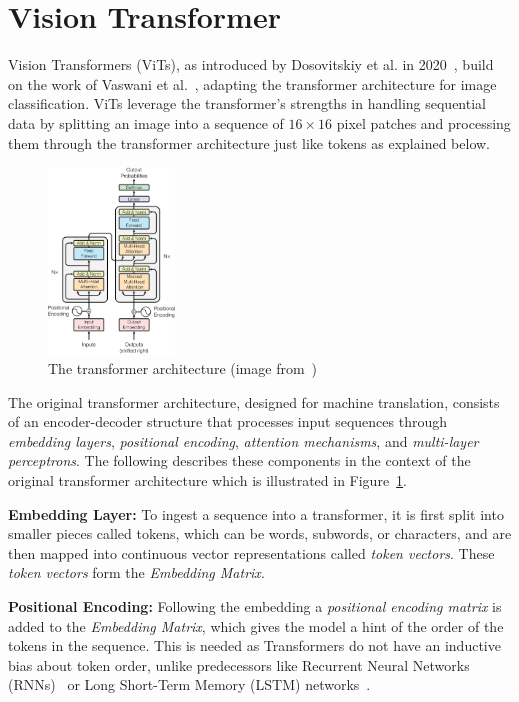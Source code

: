 \section{Vision Transformer}\label{sec:vision-transformer}
Vision Transformers (ViTs), as introduced by Dosovitskiy et al. in 2020~\cite{Dosovitskiy2020}, build on the work of Vaswani et al.~\cite{Vaswani2017}, adapting the transformer architecture for image classification. 
ViTs leverage the transformer's strengths in handling sequential data by splitting an image into a sequence of $16\times16$ pixel patches and processing them through the transformer architecture just like tokens as explained below.
\begin{figure}[h]
    \centering
    \includegraphics[width=0.3\textwidth]{images/TransformerArchitectureVaswani2017TransformerPage3.png}
    \caption[The original transformer architecture]{The transformer architecture (image from~\cite{Vaswani2017})}\label{fig:transformer}
\end{figure}

The original transformer architecture, designed for machine translation, consists of an encoder-decoder structure that processes input sequences through \emph{embedding layers}, \emph{positional encoding}, \emph{attention mechanisms}, and \emph{multi-layer perceptrons}. 
The following describes these components in the context of the original transformer architecture which is illustrated in Figure~\ref{fig:transformer}.

\textbf{Embedding Layer:} To ingest a sequence into a transformer, it is first split into smaller pieces called tokens, which can be words, subwords, or characters, and are then mapped into continuous vector representations called \emph{token vectors}. 
These \emph{token vectors} form the \emph{Embedding Matrix}.

\textbf{Positional Encoding:} Following the embedding a \emph{positional encoding matrix} is added to the \emph{Embedding Matrix}, which gives the model a hint of the order of the tokens in the sequence. 
This is needed as Transformers do not have an inductive bias about token order, unlike predecessors like Recurrent Neural Networks (RNNs)~\cite{Salehinejad2018} or Long Short-Term Memory (LSTM) networks~\cite{Hochreiter1997}.

